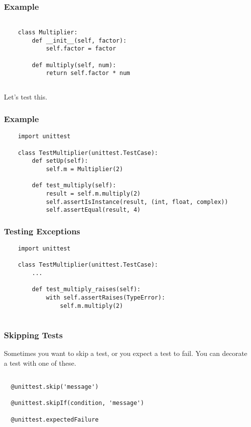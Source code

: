\documentclass[10pt]{beamer}
\begin{document}
\begin{frame}[fragile]
  \frametitle{Example}
  
  \begin{verbatim}
    
    class Multiplier:
        def __init__(self, factor):
            self.factor = factor
            
        def multiply(self, num):
            return self.factor * num    
    
   \end{verbatim} 
    Let's test this.
\end{frame}
\begin{frame}[fragile]
  \frametitle{Example}
  
  
  \begin{verbatim}
    import unittest
    
    class TestMultiplier(unittest.TestCase):
        def setUp(self):
            self.m = Multiplier(2)
                        
        def test_multiply(self):
            result = self.m.multiply(2)
            self.assertIsInstance(result, (int, float, complex))    
            self.assertEqual(result, 4)
   \end{verbatim} 
    
\end{frame}

\begin{frame}[fragile]
  \frametitle{Testing Exceptions}
  
  
  \begin{verbatim}
    import unittest
    
    class TestMultiplier(unittest.TestCase):
        ...
                                
        def test_multiply_raises(self):
            with self.assertRaises(TypeError):
                self.m.multiply(2)
 
   \end{verbatim} 
    
\end{frame}
\begin{frame}[fragile]
  \frametitle{Skipping Tests}
  
  
  Sometimes you want to skip a test, or you expect a
  test to fail. You can decorate a test with one of these.
  \begin{verbatim}
  
  @unittest.skip('message')
  
  @unittest.skipIf(condition, 'message')
  
  @unittest.expectedFailure
  
  \end{verbatim} 
    
\end{frame}
\end{document}
